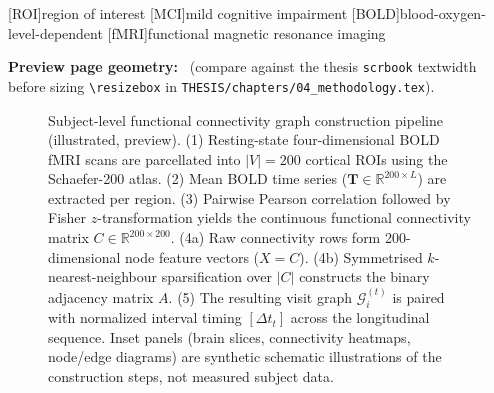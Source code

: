 \documentclass[fontsize=11pt,paper=a4]{scrbook}
\newcommand{\bg}{black}
\newcommand{\fg}{white}
\newcommand{\bg}{white}
\newcommand{\fg}{black}
\begin{document}
\pagecolor{\bg}
\color{\fg}

\begin{acronym}
  [ROI]{region of interest}
  [MCI]{mild cognitive impairment}
  [BOLD]{blood-oxygen-level-dependent}
  [fMRI]{functional magnetic resonance imaging}
\end{acronym}

\noindent\textbf{Preview page geometry:} \the\textwidth\ (compare against the thesis
\texttt{scrbook} textwidth before sizing \texttt{\textbackslash resizebox} in
\texttt{THESIS/chapters/04\_methodology.tex}).

\begin{figure}[p]
  \centering
  \resizebox{\textwidth}{!}{}
  \caption{Subject-level functional connectivity graph construction pipeline
    (illustrated, preview). (1) Resting-state four-dimensional \ac{BOLD} \ac{fMRI}
    scans are parcellated into $|V| = 200$ cortical \acp{ROI} using the Schaefer-200
    atlas. (2) Mean BOLD time series ($\mathbf{T} \in \mathbb{R}^{200 \times L}$) are
    extracted per region. (3) Pairwise Pearson correlation followed by Fisher
    $z$-transformation yields the continuous functional connectivity matrix
    $C \in \mathbb{R}^{200 \times 200}$. (4a) Raw connectivity rows form 200-dimensional
    node feature vectors ($X = C$). (4b) Symmetrised $k$-nearest-neighbour
    sparsification over $|C|$ constructs the binary adjacency matrix $A$. (5) The
    resulting visit graph $\mathcal{G}_i^{(t)}$ is paired with normalized interval
    timing $[\Delta t_t]$ across the longitudinal sequence. Inset panels (brain
    slices, connectivity heatmaps, node/edge diagrams) are synthetic schematic
    illustrations of the construction steps, not measured subject data.}
  \label{fig:graph-construction-pipeline-preview}
\end{figure}
\end{document}
